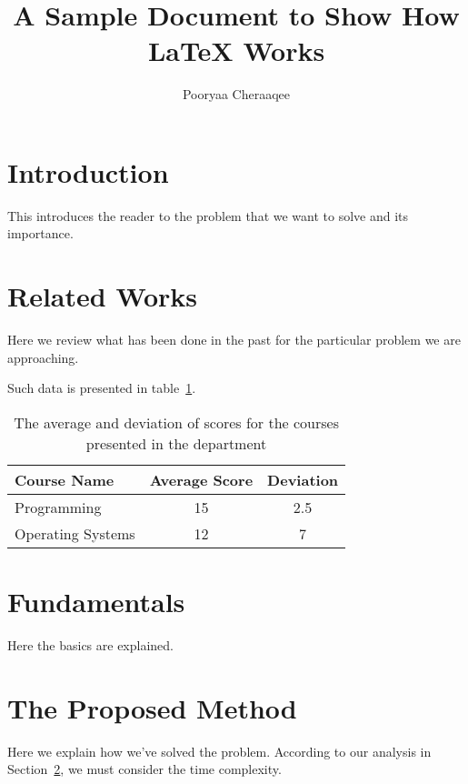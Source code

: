 \documentclass{article}
\begin{document}
\title{A Sample Document to Show How LaTeX Works}
\author{Pooryaa Cheraaqee}
\maketitle
\section{Introduction}
This introduces the reader to the problem that we want to solve and its importance.
\section{Related Works} \label{review}
Here we review what has been done in the past for the particular problem we are approaching.

Such data is presented in table~\ref{anghazi}.
\begin{table}
\caption{The average and deviation of scores for the courses presented in the department}
\label{anghazi}
\begin{tabular}{|l||cc|}
\hline
Course Name& Average Score& Deviation \\
\hline
Programming& 15& 2.5 \\
Operating Systems& 12& 7 \\
\hline

\end{tabular}
\end{table}
\section{Fundamentals}
Here the basics are explained.
\section{The Proposed Method}
Here we explain how we've solved the problem. According to our analysis in Section~\ref{review}, we must consider the time complexity.
\end{document}
